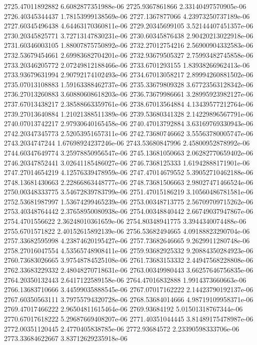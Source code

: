 {2725.47011892882 6.6082877351988e-06
2725.9367861866 2.33140497570905e-06
2726.40345344437 1.78153999138569e-06
2727.1367877066 4.23973250737189e-06
2727.60345496438 4.64463170360811e-06
2729.20345699105 3.52144407451357e-06
2730.20345825771 3.72713147830231e-06
2730.60345876438 2.90420213022918e-06
2731.60346003105 1.88007875750892e-06
2732.27012754216 2.56900904332583e-06
2732.53679454661 2.69983682704201e-06
2732.93679505327 2.75993482745858e-06
2733.20346205772 2.07249812188466e-06
2733.6701293155 1.83938266962413e-06
2733.93679631994 2.90792174102493e-06
2734.67013058217 2.89994260881502e-06
2735.07013108883 1.59163388462737e-06
2735.33679809328 3.67723563128342e-06
2736.27013260883 3.60880608618203e-06
2736.73679986661 3.28995923982127e-06
2737.67013438217 2.38588663359761e-06
2738.67013564884 4.13439577212764e-06
2739.27013640884 1.21021388511389e-06
2739.53680341328 2.14229896567791e-06
2740.07013742217 2.97930640165458e-06
2740.47013792884 3.63169769330943e-06
2742.20347345773 2.52053951657311e-06
2742.73680746662 3.55563780005747e-06
2743.2034747244 1.67698924237246e-06
2743.53680847996 2.45800952878992e-06
2744.60347649774 3.25978850956547e-06
2745.13681050663 2.06282770659402e-06
2746.20347852441 3.02641185486027e-06
2746.7368125333 1.61942888171901e-06
2747.27014654219 4.12576339478959e-06
2747.47014679552 5.39052710462188e-06
2748.13681430663 2.22866863448777e-06
2748.73681506663 2.98027471466524e-06
2750.00348333775 3.54672839783799e-06
2751.47015186219 3.10560486781581e-06
2752.53681987997 1.53674299465239e-06
2753.00348713775 2.56709709715262e-06
2753.40348764442 2.37658950080938e-06
2754.00348840442 2.66749037947867e-06
2754.4701556622 2.36248010361659e-06
2754.80348941775 3.3944340074488e-06
2755.6701571822 2.40152615892139e-06
2756.53682494665 4.09188823290704e-06
2757.33682595998 4.23874620195427e-06
2757.73682646665 9.2629911280748e-06
2758.27016047554 4.53565748908411e-06
2759.93682925332 9.20884350284923e-06
2760.73683026665 3.97548784525108e-06
2761.73683153332 2.44947568228808e-06
2762.33683229332 2.48048270718631e-06
2763.00349980443 3.66257646756835e-06
2764.20350132443 2.6417122589158e-06
2764.47016832888 1.9914373660663e-06
2766.13683710666 3.44599035888545e-06
2767.07017162222 2.14423790192137e-06
2767.60350563111 3.79755794320728e-06
2768.53684014666 4.98719109958371e-06
2769.47017466222 2.96504811615464e-06
2769.93684192 5.01501318767344e-06
2770.67017618222 5.29687669408207e-06
2771.40351044445 3.81489175478987e-06
2772.00351120445 2.4770405838785e-06
2772.93684572 2.23390598333706e-06
2773.33684622667 3.83712629235918e-06
}
